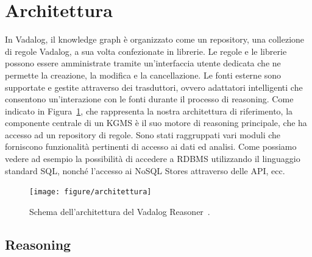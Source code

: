 \section{Architettura}

In Vadalog, il knowledge graph è organizzato come un repository, una collezione di regole Vadalog, a sua volta confezionate in librerie. \newline
Le regole e le librerie possono essere amministrate tramite un'interfaccia utente dedicata che ne permette la creazione, la modifica e la cancellazione. \newline
Le fonti esterne sono supportate e gestite attraverso dei trasduttori, ovvero adattatori intelligenti che consentono un'interazione con le fonti durante il processo di reasoning. \newline
Come indicato in Figura~\ref{fig:architettura}, che rappresenta la nostra architettura di riferimento, la componente centrale di un KGMS è il suo motore di reasoning principale, che ha accesso ad un repository di regole. Sono stati raggruppati vari moduli che forniscono funzionalità pertinenti di accesso ai dati ed analisi. Come possiamo vedere ad esempio la possibilità di accedere a RDBMS utilizzando il linguaggio standard SQL, nonché l'accesso ai NoSQL Stores attraverso delle API, ecc.

\begin{figure}[h!]
	\centering
	\texttt{[image: figure/architettura]}
	\caption{Schema dell'architettura del Vadalog Reasoner~\cite{bellomarini2017swift}.}
	\label{fig:architettura}
\end{figure}

\subsection{Reasoning}

